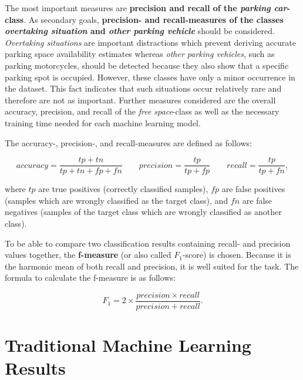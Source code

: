The most important measures are \textbf{precision and recall of the \emph{parking car}-class}. As secondary goals, \textbf{precision- and recall-measures of the classes \emph{overtaking situation} and \emph{other parking vehicle}} should be considered. \emph{Overtaking situations} are important distractions which prevent deriving accurate parking space availability estimates whereas \emph{other parking vehicles}, such as parking motorcycles, should be detected because they also show that a specific parking spot is occupied. However, these classes have only a minor occurrence in the dataset. This fact indicates that such situations occur relatively rare and therefore are not as important. Further measures considered are the overall accuracy, precision, and recall of the \emph{free space}-class as well as the necessary training time needed for each machine learning model.

The accuracy-, precision-, and recall-measures are defined as follows:

\[ accuracy = \frac{tp + tn}{tp + tn + fp + fn} \qquad precision = \frac{tp}{tp + fp} \qquad recall = \frac{tp}{tp + fn}, \]



where $tp$ are true positives (correctly classified samples), $fp$ are false positives (samples which are wrongly classified as the target class), and $fn$ are false negatives (samples of the target class which are wrongly classified as another class).

To be able to compare two classification results containing recall- and precision values together, the \textbf{f-measure} (or also called $F_1$-score) is chosen. Because it is the harmonic mean of both recall and precision, it is well suited for the task. The formula to calculate the f-measure is as follows: 

\[ F_1 = 2 \times \frac{precision \times recall}{precision + recall}. \]






\section{Traditional Machine Learning Results}
\label{sec:machine_learning_results}



